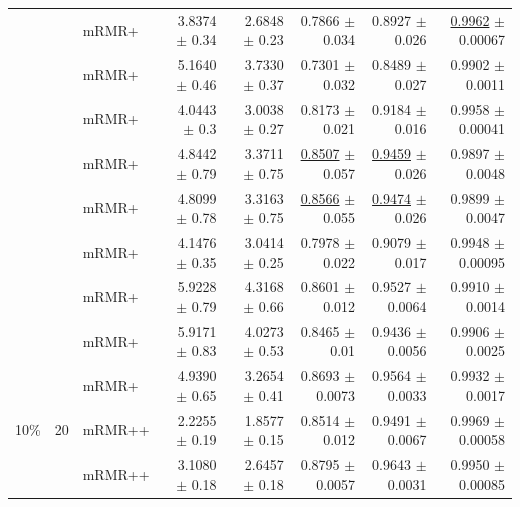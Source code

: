 \begin{longtable}{llp{}rrrrr}
 &  & mRMR+ & 3.8374 {\scriptsize $\pm$ 0.34} & 2.6848 {\scriptsize $\pm$ 0.23} & 0.7866 {\scriptsize $\pm$ 0.034} & 0.8927 {\scriptsize $\pm$ 0.026} & \underline{0.9962} {\scriptsize $\pm$ 0.00067} \\
 &  & mRMR+ & 5.1640 {\scriptsize $\pm$ 0.46} & 3.7330 {\scriptsize $\pm$ 0.37} & 0.7301 {\scriptsize $\pm$ 0.032} & 0.8489 {\scriptsize $\pm$ 0.027} & 0.9902 {\scriptsize $\pm$ 0.0011} \\
 &  & mRMR+ & 4.0443 {\scriptsize $\pm$ 0.3} & 3.0038 {\scriptsize $\pm$ 0.27} & 0.8173 {\scriptsize $\pm$ 0.021} & 0.9184 {\scriptsize $\pm$ 0.016} & 0.9958 {\scriptsize $\pm$ 0.00041} \\
 &  & mRMR+ & 4.8442 {\scriptsize $\pm$ 0.79} & 3.3711 {\scriptsize $\pm$ 0.75} & \underline{0.8507} {\scriptsize $\pm$ 0.057} & \underline{0.9459} {\scriptsize $\pm$ 0.026} & 0.9897 {\scriptsize $\pm$ 0.0048} \\
 &  & mRMR+ & 4.8099 {\scriptsize $\pm$ 0.78} & 3.3163 {\scriptsize $\pm$ 0.75} & \underline{0.8566} {\scriptsize $\pm$ 0.055} & \underline{0.9474} {\scriptsize $\pm$ 0.026} & 0.9899 {\scriptsize $\pm$ 0.0047} \\
 &  & mRMR+ & 4.1476 {\scriptsize $\pm$ 0.35} & 3.0414 {\scriptsize $\pm$ 0.25} & 0.7978 {\scriptsize $\pm$ 0.022} & 0.9079 {\scriptsize $\pm$ 0.017} & 0.9948 {\scriptsize $\pm$ 0.00095} \\
 &  & mRMR+ & 5.9228 {\scriptsize $\pm$ 0.79} & 4.3168 {\scriptsize $\pm$ 0.66} & 0.8601 {\scriptsize $\pm$ 0.012} & 0.9527 {\scriptsize $\pm$ 0.0064} & 0.9910 {\scriptsize $\pm$ 0.0014} \\
 &  & mRMR+ & 5.9171 {\scriptsize $\pm$ 0.83} & 4.0273 {\scriptsize $\pm$ 0.53} & 0.8465 {\scriptsize $\pm$ 0.01} & 0.9436 {\scriptsize $\pm$ 0.0056} & 0.9906 {\scriptsize $\pm$ 0.0025} \\
 &  & mRMR+ & 4.9390 {\scriptsize $\pm$ 0.65} & 3.2654 {\scriptsize $\pm$ 0.41} & 0.8693 {\scriptsize $\pm$ 0.0073} & 0.9564 {\scriptsize $\pm$ 0.0033} & 0.9932 {\scriptsize $\pm$ 0.0017} \\
\midrule
10\% & 20 & mRMR++ & 2.2255 {\scriptsize $\pm$ 0.19} & 1.8577 {\scriptsize $\pm$ 0.15} & 0.8514 {\scriptsize $\pm$ 0.012} & 0.9491 {\scriptsize $\pm$ 0.0067} & 0.9969 {\scriptsize $\pm$ 0.00058} \\
 &  & mRMR++ & 3.1080 {\scriptsize $\pm$ 0.18} & 2.6457 {\scriptsize $\pm$ 0.18} & 0.8795 {\scriptsize $\pm$ 0.0057} & 0.9643 {\scriptsize $\pm$ 0.0031} & 0.9950 {\scriptsize $\pm$ 0.00085} \\

\end{longtable}
